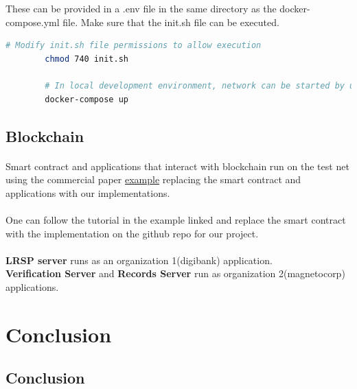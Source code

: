 \documentclass{article}
\begin{document}
        These can be provided in a .env file in the same directory as the docker-compose.yml file.
        Make sure that the init.sh file can be executed.
    
        \begin{lstlisting}[language=bash, caption=IPFS]
        # Modify init.sh file permissions to allow execution
        chmod 740 init.sh
        
        # In local development environment, network can be started by using the command:-
        docker-compose up
        \end{lstlisting}
    
        \subsection{Blockchain}
    
        \paragraph{}
        Smart contract and applications that interact with blockchain run on the test net using the commercial paper \href{https://hyperledger-fabric.readthedocs.io/en/latest/tutorial/commercial_paper.html}{example} replacing the smart contract and applications with our implementations.
        
        \paragraph{}
        One can follow the tutorial in the example linked and replace the smart contract with the implementation on the github repo for our project.\\
        \\
        \textbf{LRSP server} runs as an organization 1(digibank) application.\\
        \textbf{Verification Server} and \textbf{Records Server} run as organization 2(magnetocorp) applications.
    

    \section{Conclusion}
        \subsection{Conclusion}
\end{document}

